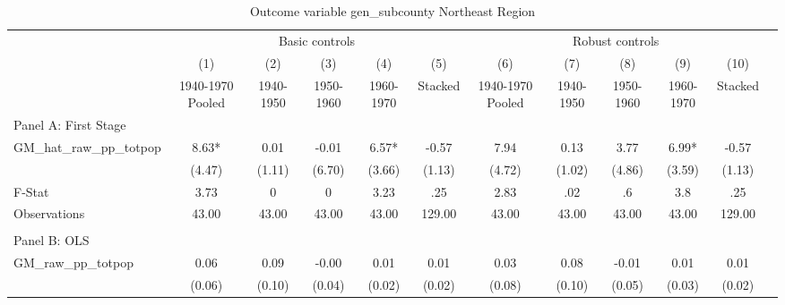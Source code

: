  \begin{table}[htbp]\centering {} \begin{threeparttable} \caption{Outcome variable gen\_subcounty Northeast Region} \begin{tabular}{l*{11}{c}} \toprule
          &\multicolumn{5}{c}{Basic controls}                                   &\multicolumn{5}{c}{Robust controls}                                  \\\cmidrule(lr){2-6}\cmidrule(lr){7-11}
          &\multicolumn{1}{c}{(1)}&\multicolumn{1}{c}{(2)}&\multicolumn{1}{c}{(3)}&\multicolumn{1}{c}{(4)}&\multicolumn{1}{c}{(5)}&\multicolumn{1}{c}{(6)}&\multicolumn{1}{c}{(7)}&\multicolumn{1}{c}{(8)}&\multicolumn{1}{c}{(9)}&\multicolumn{1}{c}{(10)}\\
          &\multicolumn{1}{c}{1940-1970 Pooled}&\multicolumn{1}{c}{1940-1950}&\multicolumn{1}{c}{1950-1960}&\multicolumn{1}{c}{1960-1970}&\multicolumn{1}{c}{Stacked}&\multicolumn{1}{c}{1940-1970 Pooled}&\multicolumn{1}{c}{1940-1950}&\multicolumn{1}{c}{1950-1960}&\multicolumn{1}{c}{1960-1970}&\multicolumn{1}{c}{Stacked}\\
\cmidrule(lr){1-11}
\multicolumn{10}{l}{Panel A: First Stage}\\
\cmidrule(lr){1-11}
GM\_hat\_raw\_pp\_totpop&      8.63*  &      0.01   &     -0.01   &      6.57*  &     -0.57   &      7.94   &      0.13   &      3.77   &      6.99*  &     -0.57   \\
          &    (4.47)   &    (1.11)   &    (6.70)   &    (3.66)   &    (1.13)   &    (4.72)   &    (1.02)   &    (4.86)   &    (3.59)   &    (1.13)   \\
\midrule
F-Stat    &      3.73   &         0   &         0   &      3.23   &       .25   &      2.83   &       .02   &        .6   &       3.8   &       .25   \\
Observations&     43.00   &     43.00   &     43.00   &     43.00   &    129.00   &     43.00   &     43.00   &     43.00   &     43.00   &    129.00   \\
\cmidrule[\heavyrulewidth](lr){1-11} \\ \cmidrule[\heavyrulewidth](lr){1-11}
\multicolumn{10}{l}{Panel B: OLS}\\
\cmidrule(lr){1-11}
GM\_raw\_pp\_totpop&      0.06   &      0.09   &     -0.00   &      0.01   &      0.01   &      0.03   &      0.08   &     -0.01   &      0.01   &      0.01   \\
          &    (0.06)   &    (0.10)   &    (0.04)   &    (0.02)   &    (0.02)   &    (0.08)   &    (0.10)   &    (0.05)   &    (0.03)   &    (0.02)   \\

\end{tabular}
\end{threeparttable}
\end{table}
